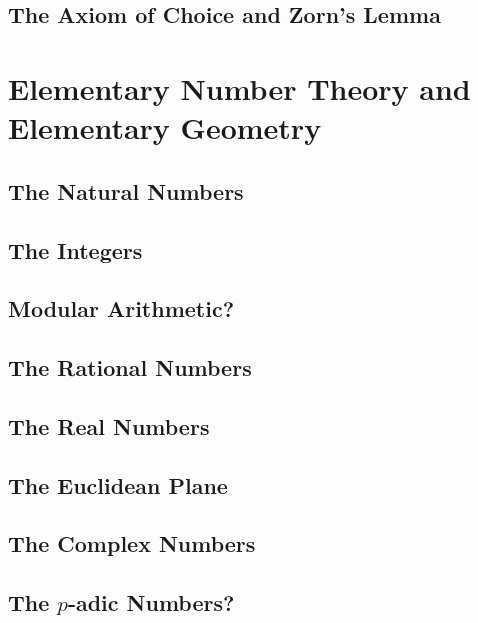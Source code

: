 \documentclass{article}
\begin{document}
	\subsection{The Axiom of Choice and Zorn's Lemma}


	\newpage
	\section{Elementary Number Theory and Elementary Geometry}
	\subsection{The Natural Numbers}


	\subsection{The Integers}


	\subsection{Modular Arithmetic?}


	\subsection{The Rational Numbers}
	\subsection{The Real Numbers}
	\subsection{The Euclidean Plane}
	\subsection{The Complex Numbers}


	\subsection{The $p$-adic Numbers?}
\end{document}
